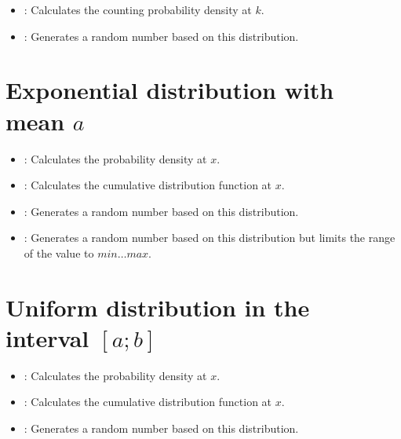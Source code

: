 \begin{itemize}

\item
{}:
Calculates the counting probability density at $k$.

\item
{}:
Generates a random number based on this distribution.

\end{itemize}



\section{Exponential distribution with mean \texorpdfstring{$a$}{a}}

\begin{itemize}

\item
{}:
Calculates the probability density at $x$.

\item
{}:
Calculates the cumulative distribution function at $x$.

\item
{}:
Generates a random number based on this distribution.

\item
{}:
Generates a random number based on this distribution but limits the range of the value to $min\ldots max$.

\end{itemize}



\section{Uniform distribution in the interval \texorpdfstring{$[a;b]$}{[a;b]}}

\begin{itemize}

\item
{}:
Calculates the probability density at $x$.

\item
{}:
Calculates the cumulative distribution function at $x$.

\item
{}:
Generates a random number based on this distribution.

\end{itemize}



